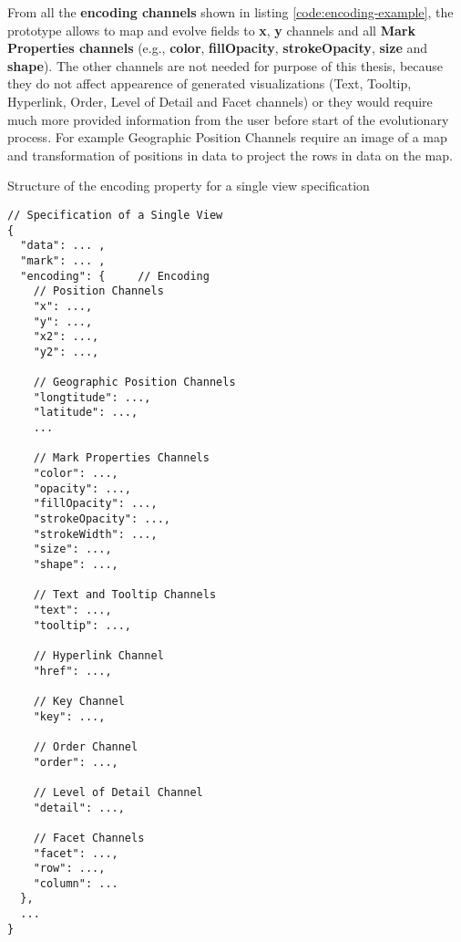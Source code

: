 From all the \textbf{encoding channels} shown in listing \ref{code:encoding-example}, the prototype allows to map and evolve fields to \textbf{x}, \textbf{y} channels and all \textbf{Mark Properties channels} (e.g., \textbf{color}, \textbf{fillOpacity}, \textbf{strokeOpacity}, \textbf{size} and \textbf{shape}). The other channels are not needed for purpose of this thesis, because they do not affect appearence of generated visualizations (Text, Tooltip, Hyperlink, Order, Level of Detail and Facet channels) or they would require much more provided information from the user before start of the evolutionary process. For example Geographic Position Channels require an image of a map and transformation of positions in data to project the rows in data on the map.
\begin{listing}[htbp]
\caption{\label{code:encoding-example}Structure of the encoding property for a single view specification \cite{vega-lite-encoding-single-view}}
\begin{verbatim}
// Specification of a Single View
{
  "data": ... ,
  "mark": ... ,
  "encoding": {     // Encoding
    // Position Channels
    "x": ...,
    "y": ...,
    "x2": ...,
    "y2": ...,

    // Geographic Position Channels
    "longtitude": ...,
    "latitude": ...,
    ...

    // Mark Properties Channels
    "color": ...,
    "opacity": ...,
    "fillOpacity": ...,
    "strokeOpacity": ...,
    "strokeWidth": ...,
    "size": ...,
    "shape": ...,

    // Text and Tooltip Channels
    "text": ...,
    "tooltip": ...,

    // Hyperlink Channel
    "href": ...,

    // Key Channel
    "key": ...,

    // Order Channel
    "order": ...,

    // Level of Detail Channel
    "detail": ...,

    // Facet Channels
    "facet": ...,
    "row": ...,
    "column": ...
  },
  ...
}
\end{verbatim}
\end{listing}


